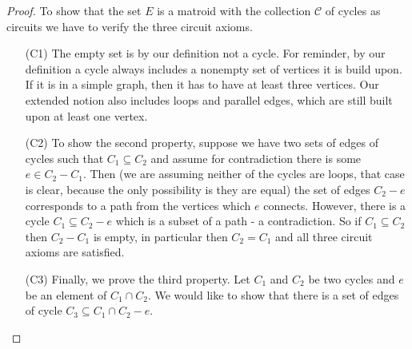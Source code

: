 \begin{proof}

To show that the set $E$ is a matroid with the collection $\mathcal{C}$ of cycles as circuits we have to verify the three circuit axioms. 

\begin{enumerate}

\item[(C1)] The empty set is by our definition not a cycle. For reminder, by our definition a cycle always includes a nonempty set of vertices it is build upon. If it is in a simple graph, then it has to have at least three vertices. Our extended notion also includes loops and parallel edges, which are still built upon at least one vertex. 

\item[(C2)] To show the second property, suppose we have two sets of edges of cycles such that $C_1 \subseteq C_2$ and assume for contradiction there is some $e \in C_2 - C_1$. Then (we are assuming neither of the cycles are loops, that case is clear, because the only possibility is they are equal) the set of edges $C_2 - e$ corresponds to a path from the vertices which $e$ connects. However, there is a cycle $C_1 \subseteq C_2 -e$ which is a subset of a path - a contradiction. So if $C_1 \subseteq C_2$ then $C_2 - C_1$ is empty, in particular then $C_2 = C_1$ and all three circuit axioms are satisfied.



    
   \item[(C3)] Finally, we prove the third property. Let $C_1$ and $C_2$ be two cycles and $e$ be an element of $C_1 \cap C_2$. We would like to show that there is a set of edges of cycle $C_3 \subseteq C_1 \cap C_2 - e$.
 


\end{enumerate}
\end{proof}
